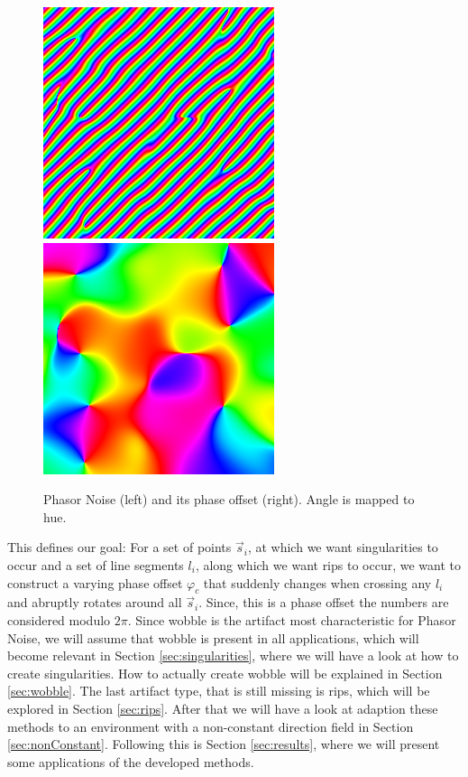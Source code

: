 \documentclass{utue} %
\begin{document}
\begin{figure}[ht]
  \centering
  \includegraphics[width=0.49\linewidth]{images/phasorNoise}
  \includegraphics[width=0.49\linewidth]{images/phasorPhase}
  \caption{Phasor Noise (left) and its phase offset (right). Angle is mapped to hue.}\label{fig:phasorNoisePhase}
\end{figure}

This defines our goal: For a set of points $\vec{s}_i$, at which we want singularities to occur and a set of line segments $l_i$, along which we want rips to occur, we want to construct a varying phase offset $\varphi_c$ that suddenly changes when crossing any $l_i$ and abruptly rotates around all $\vec{s}_i$. Since, this is a phase offset the numbers are considered modulo $2\pi$. Since wobble is the artifact most characteristic for Phasor Noise, we will assume that wobble is present in all applications, which will become relevant in Section \ref{sec:singularities}, where we will have a look at how to create singularities. How to actually create wobble will be explained in Section \ref{sec:wobble}. The last artifact type, that is still missing is rips, which will be explored in Section \ref{sec:rips}. After that we will have a look at adaption these methods to an environment with a non-constant direction field in Section \ref{sec:nonConstant}. Following this is Section \ref{sec:results}, where we will present some applications of the developed methods.
\end{document}
